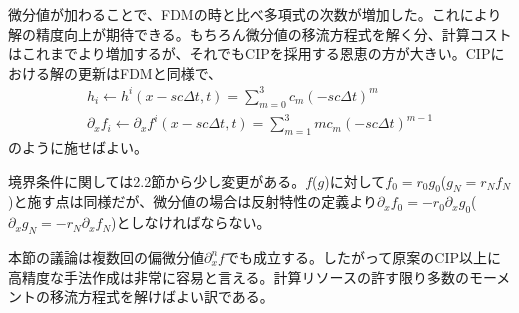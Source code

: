 \documentclass[dvipdfmx, 9pt, a4paper]{jsarticle}
\begin{document}
\begin{table}[t]
\begin{center}
\caption{CIPにおける係数(表中$h$は列毎に$f$もしくは$g$に置き換える)}
\end{center}
\end{table}

微分値が加わることで、FDMの時と比べ多項式の次数が増加した。これにより解の精度向上が期待できる。もちろん微分値の移流方程式を解く分、計算コストはこれまでより増加するが、それでもCIPを採用する恩恵の方が大きい。CIPにおける解の更新はFDMと同様で、
\begin{equation}
\begin{array}{l}
h_i \leftarrow h^i(x-sc\Delta t, t)=\sum_{m=0}^3 c_m(-sc\Delta t)^m \\
\partial_xf_i \leftarrow \partial_xf^i(x-sc\Delta t, t)=\sum_{m=1}^3 mc_m(-sc\Delta t)^{m-1}
\end{array}
\end{equation}
のように施せばよい。\par
境界条件に関しては2.2節から少し変更がある。$f$($g$)に対して$f_0=r_0g_0$($g_N=r_Nf_N$)と施す点は同様だが、微分値の場合は反射特性の定義より$\partial_xf_0=-r_0\partial_xg_0$($\partial_xg_N=-r_N\partial_xf_N$)としなければならない。\par
本節の議論は複数回の偏微分値$\partial_x^nf$でも成立する。したがって原案のCIP以上に高精度な手法作成は非常に容易と言える。計算リソースの許す限り多数のモーメントの移流方程式を解けばよい訳である。
\end{document}
